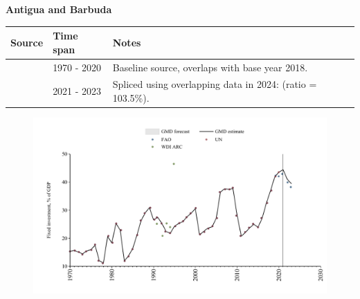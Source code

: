 \documentclass[12pt,a4paper,landscape]{article}
\begin{document}
\begin{adjustbox}{max totalsize={\paperwidth}{\paperheight},center}
\begin{minipage}[t][\textheight][t]{\textwidth}
\vspace*{0.5cm}
{}
\begin{center}
{\Large\bfseries Antigua and Barbuda}
\end{center}
\vspace{0.5cm}
\begin{table}[H]
\centering
\small
\begin{tabular}{|l|l|l|}
\hline
\textbf{Source} & \textbf{Time span} & \textbf{Notes} \\
\hline
\rowcolor{white}\cite{UN}& 1970 - 2020 &Baseline source, overlaps with base year 2018.\\
\rowcolor{lightgray}\cite{FAO}& 2021 - 2023 &Spliced using overlapping data in 2024: (ratio = 103.5\%).\\
\hline
\end{tabular}
\end{table}
\begin{figure}[H]
\centering
\includegraphics[width=\textwidth,height=0.6\textheight,keepaspectratio]{graphs/ATG_finv_GDP.pdf}
\end{figure}
\end{minipage}
\end{adjustbox}
\end{document}
